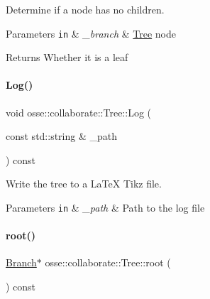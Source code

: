 Determine if a node has no children. 


\begin{DoxyParams}[1]{Parameters}
\mbox{\tt in}  & {\em \+\_\+branch} & \hyperlink{classosse_1_1collaborate_1_1_tree}{Tree} node \\
\hline
\end{DoxyParams}
\begin{DoxyReturn}{Returns}
Whether it is a leaf 
\end{DoxyReturn}
\mbox{\label{classosse_1_1collaborate_1_1_tree_aa0f69e21e7eacd90468ae534d83b0575}} 
\paragraph{\texorpdfstring{Log()}{Log()}}
{\footnotesize\ttfamily void osse\+::collaborate\+::\+Tree\+::\+Log (\begin{DoxyParamCaption}\item[{const std\+::string \&}]{\+\_\+path }\end{DoxyParamCaption}) const}



Write the tree to a La\+TeX Tikz file. 


\begin{DoxyParams}[1]{Parameters}
\mbox{\tt in}  & {\em \+\_\+path} & Path to the log file \\
\hline
\end{DoxyParams}
\mbox{\label{classosse_1_1collaborate_1_1_tree_a65d78ce80c9efa9af095d9081d6abc80}} 
\paragraph{\texorpdfstring{root()}{root()}}
{\footnotesize\ttfamily \hyperlink{structosse_1_1collaborate_1_1_tree_1_1_branch}{Branch}$\ast$ osse\+::collaborate\+::\+Tree\+::root (\begin{DoxyParamCaption}{ }\end{DoxyParamCaption}) const\hspace{0.3cm}{\ttfamily [inline]}}




